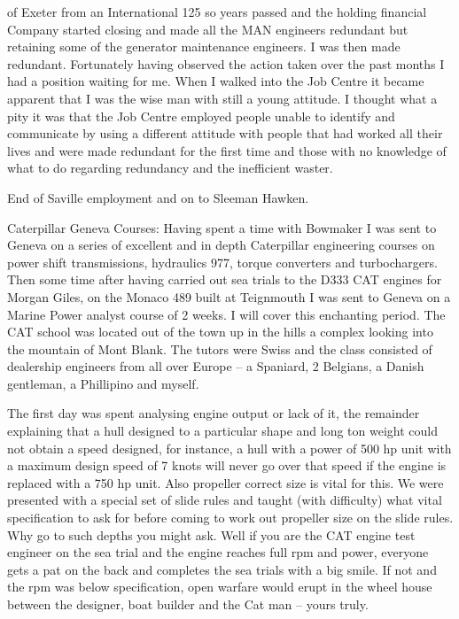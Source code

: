 of Exeter from an International 125 so years passed and the holding financial
Company started closing and made all the MAN engineers redundant but retaining
some of the generator maintenance engineers.  I was then made redundant.
Fortunately having observed the action taken over the past months I had a
position waiting for me.  When I walked into the Job Centre it became apparent
that I was the wise man with still a young attitude.  I thought what a pity it
was that the Job Centre employed people unable to identify and communicate by
using a different attitude with people that had worked all their lives and were
made redundant for the first time and those with no knowledge of what to do
regarding redundancy and the inefficient waster.

End of Saville employment and on to Sleeman Hawken.

Caterpillar Geneva Courses:  Having spent a time with Bowmaker I was sent to
Geneva on a series of excellent and in depth Caterpillar engineering courses on
power shift transmissions, hydraulics 977, torque converters and turbochargers.
Then some time after having carried out sea trials to the D333 CAT engines for
Morgan Giles, on the Monaco 489 built at Teignmouth I was sent to Geneva on a
Marine Power analyst course of 2 weeks.  I will cover this enchanting period.
The CAT school was located out of the town up in the hills a complex looking
into the mountain of Mont Blank.  The tutors were Swiss and the class consisted
of dealership engineers from all over Europe – a Spaniard, 2 Belgians, a Danish
gentleman, a Phillipino and myself.

The first day was spent analysing engine output or lack of it, the remainder
explaining that a hull designed to a particular shape and long ton weight could
not obtain a speed designed, for instance, a hull with a power of 500 hp unit
with a maximum design speed of 7 knots will never go over that speed if the
engine is replaced with a 750 hp unit.  Also propeller correct size is vital
for this. We were presented with a special set of slide rules and taught
(with difficulty) what vital specification to ask for before coming to work out
propeller size on the slide rules.  Why go to such depths you might ask.  Well
if you are the CAT engine test engineer on the sea trial and the engine reaches
full rpm and power, everyone gets a pat on the back and completes the sea
trials with a big smile.  If not and the rpm was below specification, open
warfare would erupt in the wheel house between the designer, boat builder and
the Cat man – yours truly.

